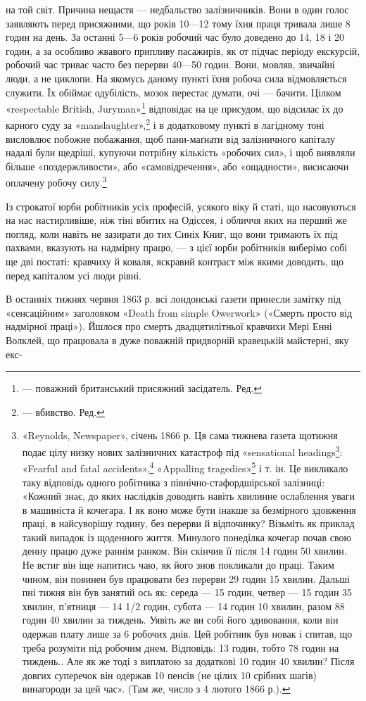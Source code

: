 на той світ. Причина нещастя — недбальство залізничників. Вони
в один голос заявляють перед присяжними, що років 10—12 тому
їхня праця тривала лише 8 годин на день. За останні 5—6 років
робочий час було доведено до 14, 18 і 20 годин, а за особливо
жвавого припливу пасажирів, як от підчас періоду екскурсій,
робочий час триває часто без перерви 40—50 годин. Вони, мовляв,
звичайні люди, а не циклопи. На якомусь даному пункті
їхня робоча сила відмовляється служити. Їх обіймає одубілість,
мозок перестає думати, очі — бачити. Цілком «respectable Вгіtish,
Juryman»\footnote*{
— поважний британський присяжний засідатель. Ред.
} відповідає на це присудом, що відсилає їх до
карного суду за «manslaughter»,\footnote*{
— вбивство. Ред.
} і в додатковому пункті в лагідному
тоні висловлює побожне побажання, щоб пани-маґнати
від залізничного капіталу надалі були щедріші, купуючи потрібну
кількість «робочих сил», і щоб виявляли більше «поздержливости»,
або «самовідречення», або «ощадности», висисаючи
оплачену робочу силу.\footnote{
«Reynolds, Newspaper», січень 1866 р. Ця сама тижнева газета щотижня
подає цілу низку нових залізничних катастроф під «sensational headings\footnote*{
— сенсаційними заголовками. Ред.
}:
«Fearful and fatal accidents»,\footnote*{
Жахливий і фатальний випадок. Ред.
} «Appalling tragedies»\footnote*{
Жахлива трагедія. Ред.
} і т. ін.
Це викликало таку відповідь одного робітника з північно-стафордшірської
залізниці: «Кожний знає, до яких наслідків доводить навіть хвилинне
ослаблення уваги в машиніста й кочегара. І як воно може бути інакше
за безмірного здовження праці, в найсуворішу годину, без перерви й відпочинку?
Візьміть як приклад такий випадок із щоденного життя. Минулого
понеділка кочегар почав свою денну працю дуже раннім ранком.
Він скінчив її після 14 годин 50 хвилин. Не встиг він іще напитись чаю,
як його знов покликали до праці. Таким чином, він повинен був працювати
без перерви 29 годин 15 хвилин. Дальші пні тижня він був занятий ось
як: середа — 15 годин, четвер — 15 годин 35 хвилин, п’ятниця — 14 1/2 годин,
субота — 14 годин 10 хвилин, разом 88 годин 40 хвилин за тиждень.
Уявіть же ви собі його здивовання, коли він одержав плату лише за 6 робочих
днів. Цей робітник був новак і спитав, що треба розуміти під робочим
днем. Відповідь: 13 годин, тобто 78 годин на тиждень.. Але як же тоді
з виплатою за додаткові 10 годин 40 хвилин? Після довгих суперечок він
одержав 10 пенсів (не цілих 10 срібних шагів) винагороди за цей час».
(Там же, число з 4 лютого 1866 р.).
}

Із строкатої юрби робітників усіх професій, усякого віку й
статі, що насовуються на нас настирливіше, ніж тіні вбитих на
Одіссея, і обличчя яких на перший же погляд, коли навіть не
зазирати до тих Синіх Книг, що вони тримають їх під пахвами,
вказують на надмірну працю, — з цієї юрби робітників виберімо
собі ще дві постаті: кравчиху й коваля, яскравий контраст між
якими доводить, що перед капіталом усі люди рівні.

В останніх тижнях червня 1863 р. всі лондонські газети принесли
замітку під «сенсаційним» заголовком «Death from simple
Owerwork» («Смерть просто від надмірної праці»). Йшлося про
смерть двадцятилітньої кравчихи Мері Енні Волклей, що працювала
в дуже поважній придворній кравецькій майстерні, яку екс-